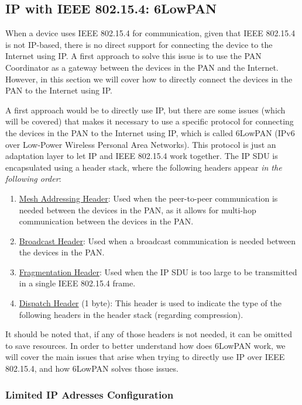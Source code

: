 \subsection{IP with IEEE 802.15.4: 6LowPAN}

When a device uses IEEE 802.15.4 for communication, given that IEEE 802.15.4 is not IP-based, there is no direct support for connecting the device to the Internet using IP. A first approach to solve this issue is to use the PAN Coordinator as a gateway between the devices in the PAN and the Internet. However, in this section we will cover how to directly connect the devices in the PAN to the Internet using IP.

A first approach would be to directly use IP, but there are some issues (which will be covered) that makes it necessary to use a specific protocol for connecting the devices in the PAN to the Internet using IP, which is called 6LowPAN (IPv6 over Low-Power Wireless Personal Area Networks). This protocol is just an adaptation layer to let IP and IEEE 802.15.4 work together. The IP SDU is encapsulated using a header stack, where the following headers appear \emph{in the following order}:
\begin{enumerate}
    \item \ul{Mesh Addressing Header}: Used when the peer-to-peer communication is needed between the devices in the PAN, as it allows for multi-hop communication between the devices in the PAN.
    \item \ul{Broadcast Header}: Used when a broadcast communication is needed between the devices in the PAN.
    \item \ul{Fragmentation Header}: Used when the IP SDU is too large to be transmitted in a single IEEE 802.15.4 frame.
    \item \ul{Dispatch Header} (1 byte): This header is used to indicate the type of the following headers in the header stack (regarding compression).
\end{enumerate}
It should be noted that, if any of those headers is not needed, it can be omitted to save resources. In order to better understand how does 6LowPAN work, we will cover the main issues that arise when trying to directly use IP over IEEE 802.15.4, and how 6LowPAN solves those issues.

\subsubsection{Limited IP Adresses Configuration}

